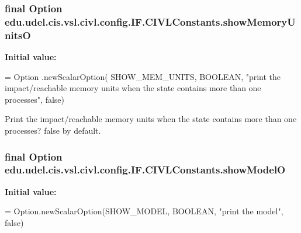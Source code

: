 \hypertarget{classedu_1_1udel_1_1cis_1_1vsl_1_1civl_1_1config_1_1IF_1_1CIVLConstants_a2ee171df807b757e1939921c136ed0de}{}
\subsubsection[{show\+Memory\+Units\+O}]{\setlength{\rightskip}{0pt plus 5cm}final Option edu.\+udel.\+cis.\+vsl.\+civl.\+config.\+I\+F.\+C\+I\+V\+L\+Constants.\+show\+Memory\+Units\+O\hspace{0.3cm}{\ttfamily [static]}}\label{classedu_1_1udel_1_1cis_1_1vsl_1_1civl_1_1config_1_1IF_1_1CIVLConstants_a2ee171df807b757e1939921c136ed0de}
{\bfseries Initial value\+:}
\begin{DoxyCode}
= Option
            .newScalarOption(
                    SHOW\_MEM\_UNITS,
                    BOOLEAN,
                    \textcolor{stringliteral}{"print the impact/reachable memory units when the state contains more than one
       processes"},
                    \textcolor{keyword}{false})
\end{DoxyCode}


Print the impact/reachable memory units when the state contains more than one processes? false by default. 

\hypertarget{classedu_1_1udel_1_1cis_1_1vsl_1_1civl_1_1config_1_1IF_1_1CIVLConstants_adead4ea0b8731d999ff5cc756eb225f1}{}
\subsubsection[{show\+Model\+O}]{\setlength{\rightskip}{0pt plus 5cm}final Option edu.\+udel.\+cis.\+vsl.\+civl.\+config.\+I\+F.\+C\+I\+V\+L\+Constants.\+show\+Model\+O\hspace{0.3cm}{\ttfamily [static]}}\label{classedu_1_1udel_1_1cis_1_1vsl_1_1civl_1_1config_1_1IF_1_1CIVLConstants_adead4ea0b8731d999ff5cc756eb225f1}
{\bfseries Initial value\+:}
\begin{DoxyCode}
= Option.newScalarOption(SHOW\_MODEL,
            BOOLEAN, \textcolor{stringliteral}{"print the model"}, \textcolor{keyword}{false})
\end{DoxyCode}


